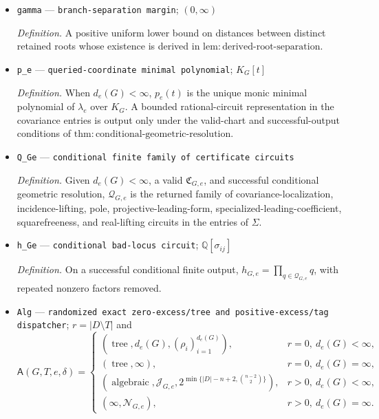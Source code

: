 \documentclass{article}
\begin{document}
\begin{itemize}
  \par\smallskip\noindent\emph{Definition.} \(\mathfrak C_{G,e}\) is the valid localized reduced regular-sequence and lifting package defined in \(\mathrm{def:source\mbox{-}prime\mbox{-}chart}\).
  \item \texttt{gamma} --- \texttt{branch-\allowbreak{}separation margin}; \((0,\infty)\)
  \par\smallskip\noindent\emph{Definition.} A positive uniform lower bound on distances between distinct retained roots whose existence is derived in \(\mathrm{lem:derived\mbox{-}root\mbox{-}separation}\).
  \item \texttt{p\_\allowbreak{}e} --- \texttt{queried-\allowbreak{}coordinate minimal polynomial}; \(K_G[t]\)
  \par\smallskip\noindent\emph{Definition.} When \(d_e(G)<\infty\), \(p_e(t)\) is the unique monic minimal polynomial of \(\lambda_e\) over \(K_G\). A bounded rational-circuit representation in the covariance entries is output only under the valid-chart and successful-output conditions of \(\mathrm{thm:conditional\mbox{-}geometric\mbox{-}resolution}\).
  \item \texttt{Q\_\allowbreak{}Ge} --- \texttt{conditional finite family of certificate circuits}
  \par\smallskip\noindent\emph{Definition.} Given \(d_e(G)<\infty\), a valid \(\mathfrak C_{G,e}\), and successful conditional geometric resolution, \(\mathcal Q_{G,e}\) is the returned family of covariance-localization, incidence-lifting, pole, projective-leading-form, specialized-leading-coefficient, squarefreeness, and real-lifting circuits in the entries of \(\Sigma\).
  \item \texttt{h\_\allowbreak{}Ge} --- \texttt{conditional bad-\allowbreak{}locus circuit}; \(\mathbb Q[\sigma_{ij}]\)
  \par\smallskip\noindent\emph{Definition.} On a successful conditional finite output, \(h_{G,e}=\prod_{q\in\mathcal Q_{G,e}}q\), with repeated nonzero factors removed.
  \item \texttt{Alg} --- \texttt{randomized exact zero-\allowbreak{}excess/\allowbreak{}tree and positive-\allowbreak{}excess/\allowbreak{}tag dispatcher}; \(r=|D\setminus T|\) and \(\mathsf A(G,T,e,\delta)=\begin{cases}(\operatorname{tree},d_e(G),(\rho_i)_{i=1}^{d_e(G)}),&r=0,\ d_e(G)<\infty,\\(\operatorname{tree},\infty),&r=0,\ d_e(G)=\infty,\\(\operatorname{algebraic},\mathcal J_{G,e},2^{\min\{|D|-n+2,\binom{n-2}{2}\}}),&r>0,\ d_e(G)<\infty,\\(\infty,\mathcal N_{G,e}),&r>0,\ d_e(G)=\infty.\end{cases}\)

\end{itemize}
\end{document}
